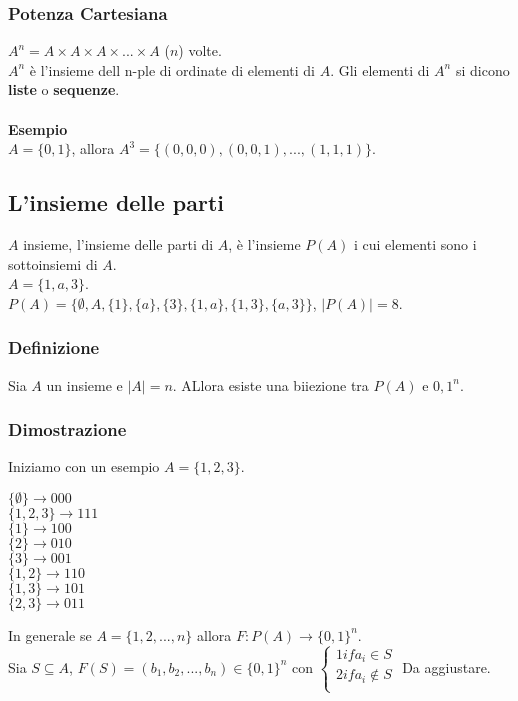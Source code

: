 \documentclass[11pt]{article}
\begin{document}
            \subsubsection{Potenza Cartesiana}
            $A^n = A \times A \times A \times ... \times A$ ($n$) volte.\\
            $A^n$ è l'insieme dell n-ple di ordinate di elementi di $A$.
            Gli elementi di $A^n$ si dicono \textbf{liste} o \textbf{sequenze}.\\
            \\
            \textbf{\large Esempio}\\
            $A = \{0,1\}$, allora $A^3 = \{(0,0,0), (0,0,1),...,(1,1,1) \}$.\\
            \subsection{L'insieme delle parti}
            $A$ insieme, l'insieme delle parti di $A$, è l'insieme $P(A)$ i cui elementi sono i sottoinsiemi di $A$.\\
            $A = \{1,a,3\}$.\\
            $P(A) = \{\emptyset, A, \{1\}, \{a\}, \{3\}, \{1,a\}, \{1,3\}, \{a,3\}\}$, $|P(A)| = 8$.\\
            \subsubsection{Definizione}
            Sia $A$ un insieme e $|A| = n$. ALlora esiste una biiezione tra $P(A)$ e ${0,1}^n$.
            \subsubsection{Dimostrazione}
            Iniziamo con un esempio $A = \{1,2,3\}$.
            \begin{center}
            	$\{\emptyset\} \longrightarrow 000$ \\
            	$\{1,2,3\} \longrightarrow 111$\\
            	$\{1\} \longrightarrow 100$\\
            	$\{2\} \longrightarrow 010$\\
            	$\{3\} \longrightarrow 001$\\
            	$\{1,2\} \longrightarrow 110$\\
            	$\{1,3\} \longrightarrow 101$\\
            $\{2,3\} \longrightarrow 011$\\
            \end{center}
            In generale se $A = \{1,2,...,n\}$ allora $F:P(A) \to \{0,1\}^n$.\\
            Sia $S \subseteq A$, $F(S) = (b_1,b_2,...,b_n) \in \{0,1\}^n$ con $\begin{cases}
            1 if a_i \in S\\
            2 if a_i \not\in S\\
            \end{cases}$
            Da aggiustare.\\
\end{document}
